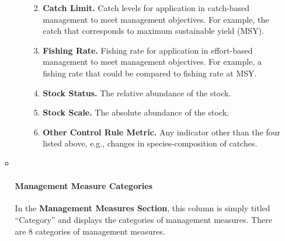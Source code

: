 \documentclass[
  11pt,
]{book}
\providecommand{\tightlist}{%
  \setlength{\itemsep}{0pt}\setlength{\parskip}{0pt}}
\begin{document}
\begin{itemize}
\begin{itemize}
\begin{enumerate}
      \begin{enumerate}
      \def\labelenumii{\alph{enumii}.}
      \tightlist
      \item
        \textbf{Catch Limit.} Catch levels for application in catch-based management to meet management objectives. For example, the catch that corresponds to maximum sustainable yield (MSY).
      \item
        \textbf{Fishing Rate.} Fishing rate for application in effort-based management to meet management objectives. For example, a fishing rate that could be compared to fishing rate at MSY.
      \item
        \textbf{Stock Status.} The relative abundance of the stock.
      \item
        \textbf{Stock Scale.} The absolute abundance of the stock.
      \item
        \textbf{Other Control Rule Metric.} Any indicator other than the four listed above, e.g., changes in species-composition of catches.
      \end{enumerate}
    \end{enumerate}
  \item ~
    \hypertarget{management-measure-categories}{%
    \paragraph{Management Measure Categories}\label{management-measure-categories}}

    In the \textbf{Management Measures Section}, this column is simply titled ``Category'' and displays the categories of management measures. There are 8 categories of management measures.


\end{itemize}
\end{itemize}
\end{document}
